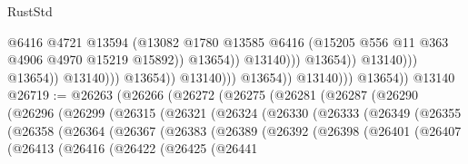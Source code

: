 \begin{lexlean}{RustStd}
\begin{coremodule}
                                                          @6416
                                                          @4721
                                                          @13594
                                                          (@13082
                                                            @1780
                                                            @13585
                                                            @6416
                                                            (@15205
                                                              @556
                                                              @11
                                                              @363
                                                              @4906
                                                              @4970
                                                              @15219
                                                              @15892))
                                                          @13654))
                                                      @13140)))
                                                @13654))
                                            @13140)))
                                      @13654))
                                  @13140)))
                            @13654))
                        @13140)))
                  @13654))
              @13140)))
        @13654))
    @13140
@26719 := @26263
    (@26266
      (@26272
        (@26275
          (@26281
            (@26287
              (@26290
                (@26296
                  (@26299
                    (@26315
                      (@26321
                        (@26324
                          (@26330
                            (@26333
                              (@26349
                                (@26355
                                  (@26358
                                    (@26364
                                      (@26367
                                        (@26383
                                          (@26389
                                            (@26392
                                              (@26398
                                                (@26401
                                                  (@26407
                                                    (@26413
                                                      (@26416
                                                        (@26422
                                                          (@26425
                                                            (@26441

\end{coremodule}
\end{lexlean}
